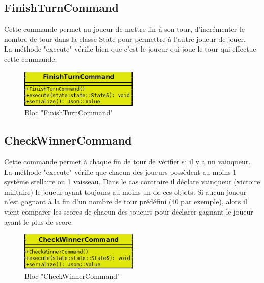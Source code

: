 \subsection{FinishTurnCommand}

Cette commande permet au joueur de mettre fin à son tour, d'incrémenter le nombre de tour dans la classe State pour permettre à l'autre joueur de jouer. \\
La méthode "execute" vérifie bien que c'est le joueur qui joue le tour qui effectue cette commande.

\begin{figure}[!h]
\centering
\includegraphics[width=0.5\textwidth]{pics/engine_pics/FinishTurnCommand.PNG}
\caption[Bloc "FinishTurnCommand"]{\label{figure_simple}Bloc "FinishTurnCommand"}
\end{figure}

\subsection{CheckWinnerCommand}

Cette commande permet à chaque fin de tour de vérifier si il y a un vainqueur. \\ 
La méthode "execute" vérifie que chacun des joueurs possèdent au moins 1 système stellaire ou 1 vaisseau. Dans le cas contraire il déclare vainqueur (victoire militaire) le joueur ayant toujours au moins un de ces objets. Si aucun joueur n'est gagnant à la fin d'un nombre de tour prédéfini (40 par exemple), alors il vient comparer les scores de chacun des joueurs pour déclarer gagnant le joueur ayant le plus de score.

\begin{figure}[!h]
\centering
\includegraphics[width=0.5\textwidth]{pics/engine_pics/CheckWinnerCommand.PNG}
\caption[Bloc "CheckWinnerCommand"]{\label{figure_simple}Bloc "CheckWinnerCommand"}
\end{figure}
